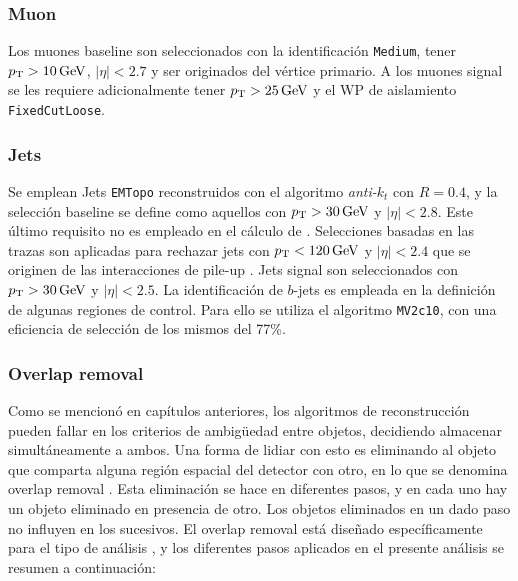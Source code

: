 \subsubsection{Muon}

Los muones baseline son seleccionados con la identificación \texttt{Medium}, tener $p_{\text{T}}>10\,\text{GeV}$, $|\eta|<2.7$ y ser originados del vértice primario. A los muones signal se les requiere adicionalmente tener $p_{\text{T}}>25\,\text{GeV}$ y el WP de aislamiento \texttt{FixedCutLoose}.


\subsubsection{Jets}

Se emplean Jets \texttt{EMTopo} reconstruidos con el algoritmo \textit{anti-$k_t$} con $R=0.4$, y la selección baseline se define como aquellos con $p_{\text{T}}>30\,\text{GeV}$ y $|\eta|<2.8$. Este último requisito no es empleado en el cálculo de \met. Selecciones basadas en las trazas son aplicadas para rechazar jets con $p_{\text{T}}<120\,\text{GeV}$ y $|\eta|<2.4$ que se originen de las interacciones de pile-up \cite{ATL-PHYS-PUB-2014-001}. Jets signal son seleccionados con $p_{\text{T}}>30\,\text{GeV}$ y $|\eta|<2.5$. La identificación de $b$-jets es empleada en la definición de algunas regiones de control. Para ello se utiliza el algoritmo \texttt{MV2c10}, con una eficiencia de selección de los mismos del 77\%.

\subsubsection{Overlap removal}

Como se mencionó en capítulos anteriores, los algoritmos de reconstrucción pueden fallar en los criterios de ambigüedad entre objetos, decidiendo almacenar simultáneamente a ambos. Una forma de lidiar con esto es eliminando al objeto que comparta alguna región espacial del detector con otro, en lo que se denomina overlap removal \cite{Adams:1743654}. Esta eliminación se hace en diferentes pasos, y en cada uno hay un objeto eliminado en presencia de otro. Los objetos eliminados en un dado paso no influyen en los sucesivos.
El overlap removal está diseñado específicamente para el tipo de análisis \cite{ATL-COM-PHYS-2016-1518}, y los diferentes pasos aplicados en el presente análisis se resumen a continuación: 

